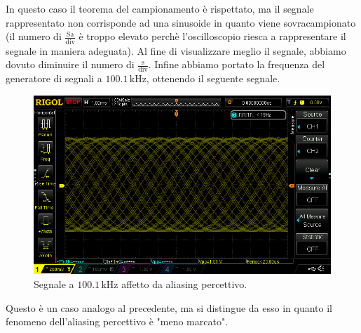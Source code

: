 \documentclass{article}
\begin{document}
				\newline
				In questo caso il teorema del campionamento è rispettato, ma il segnale rappresentato non corrisponde ad una sinusoide in quanto viene sovracampionato (il numero di $ \mathrm{\frac{Sa}{div}} $ è troppo elevato perchè l'oscilloscopio riesca a rappresentare il segnale in maniera adeguata). Al fine di visualizzare meglio il segnale, abbiamo dovuto diminuire il numero di $ \mathrm{\frac{s}{div}} $.
				\newline
				Infine abbiamo portato la frequenza del generatore di segnali a $ 100.1 \, \mathrm{kHz} $, ottenendo il seguente segnale.
				\begin{figure}[h!]
					\centering
					\includegraphics[scale=0.4]{aliasingPercettivo100kHz}
					\caption{Segnale a $ 100.1 \, \mathrm{kHz} $ affetto da aliasing percettivo.}
					\label{fig:aliasingPercettivo100kHz}
				\end{figure}
				\newpage
				Questo è un caso analogo al precedente, ma si distingue da esso in quanto il fenomeno dell'aliasing percettivo è "meno marcato".
\end{document}

